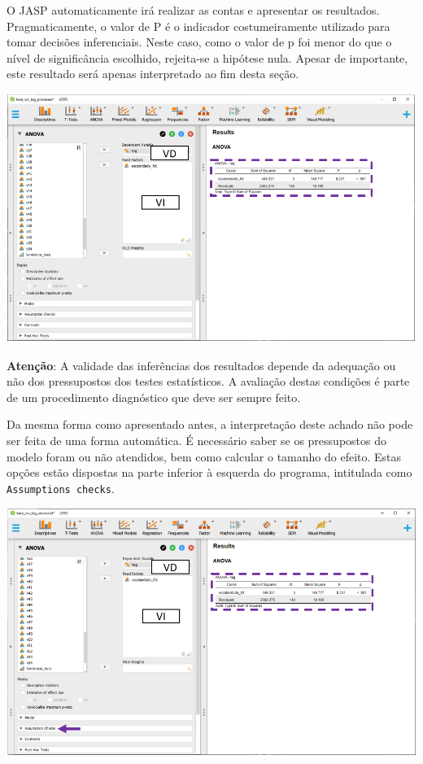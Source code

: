 \documentclass[
]{book}
\begin{document}
O JASP automaticamente irá realizar as contas e apresentar os
resultados. Pragmaticamente, o valor de P é o indicador costumeiramente
utilizado para tomar decisões inferenciais. Neste caso, como o valor de
p foi menor do que o nível de significância escolhido, rejeita-se a
hipótese nula. Apesar de importante, este resultado será apenas
interpretado ao fim desta seção.

\includegraphics{./img/cap_anova_resultados_iniciais.png}

\begin{warning}

\textbf{Atenção}: A validade das inferências dos resultados depende da
adequação ou não dos pressupostos dos testes estatísticos. A avaliação
destas condições é parte de um procedimento diagnóstico que deve ser
sempre feito.

\end{warning}

Da mesma forma como apresentado antes, a interpretação deste achado não
pode ser feita de uma forma automática. É necessário saber se os
pressupostos do modelo foram ou não atendidos, bem como calcular o
tamanho do efeito. Estas opções estão dispostas na parte inferior à
esquerda do programa, intitulada como \texttt{Assumptions\ checks}.

\includegraphics{./img/cap_anova_assumptions.png}
\end{document}
